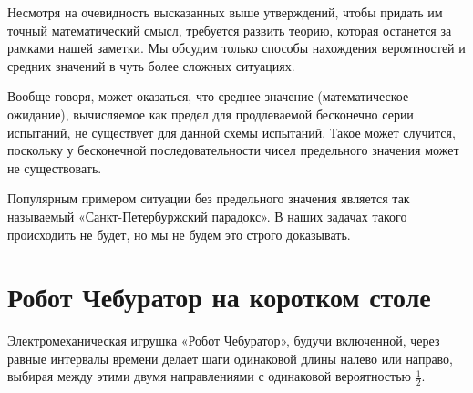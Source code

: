 \documentclass{article}
\begin{document}
\medskip

Несмотря на очевидность высказанных выше утверждений,
чтобы придать им точный математический смысл,
требуется развить теорию, которая останется за рамками нашей заметки.
Мы обсудим только способы нахождения вероятностей и средних значений в чуть более сложных ситуациях.

Вообще говоря, может оказаться, что среднее значение (математическое ожидание), вычисляемое как предел для продлеваемой бесконечно серии испытаний, не существует для данной схемы испытаний. 
Такое может случится,
поскольку у бесконечной последовательности чисел предельного значения может не существовать.

Популярным примером ситуации без предельного значения является так называемый «Санкт-Петербуржский парадокс». 
В наших задачах такого происходить не будет,
но мы не будем это строго доказывать.

\section{Робот Чебуратор на коротком столе} 

Электромеханическая игрушка «Робот Чебуратор», 
будучи включенной, через равные интервалы времени делает шаги одинаковой длины налево или направо,
выбирая между этими двумя направлениями с одинаковой вероятностью $\tfrac12$.
\end{document}
